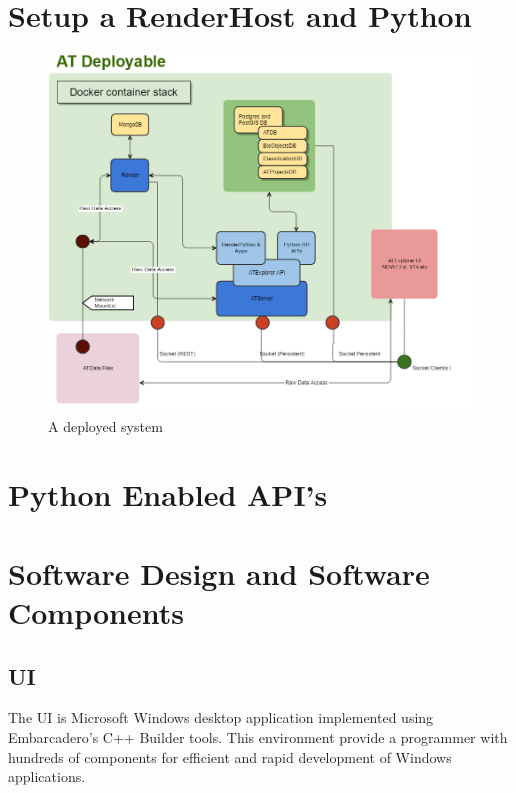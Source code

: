 \documentclass[11pt,fleqn]{book} %
\begin{document}
\begin{appendices}

\startcontents[chapter]

\chapter{Setup a RenderHost and Python}
\begin{figure}[h]
\centering\includegraphics[scale=0.50]{ATDeployable_1}
\caption{A deployed system}
\end{figure}

\chapter{Python Enabled API's}

\chapter{Software Design and Software Components}

\section{\ate UI}
The \ate UI is Microsoft Windows desktop application implemented using Embarcadero's C++ Builder tools. 
This environment provide a programmer with hundreds of components for efficient and rapid development of Windows applications.


\end{appendices}
\end{document}
